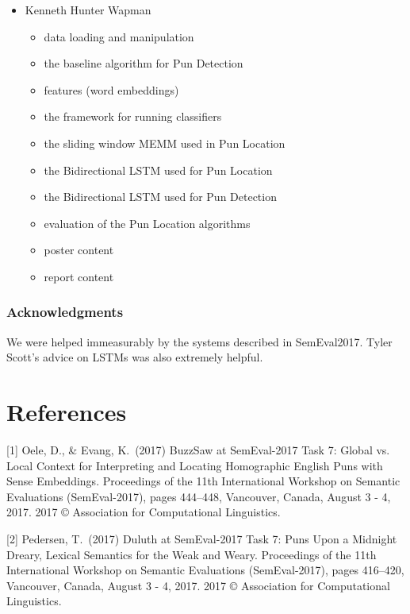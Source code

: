 \documentclass{article}
\begin{document}
\begin{itemize}
\begin{itemize}
	\end{itemize}
\item Kenneth Hunter Wapman
	\begin{itemize}
		\item data loading and manipulation
		\item the baseline algorithm for Pun Detection
		\item features (word embeddings)
		\item the framework for running classifiers
		\item the sliding window MEMM used in Pun Location
		\item the Bidirectional LSTM used for Pun Location
		\item the Bidirectional LSTM used for Pun Detection
		\item evaluation of the Pun Location algorithms
		\item poster content
		\item report content
	\end{itemize}
\end{itemize}

\subsubsection*{Acknowledgments}

We were helped immeasurably by the systems described in SemEval2017. Tyler
Scott's advice on LSTMs was also extremely helpful.

\section*{References}

\medskip

\small

[1] Oele, D., \& Evang, K.\ (2017) BuzzSaw at SemEval-2017 Task 7:
Global vs. Local Context for Interpreting and Locating Homographic English Puns
with Sense Embeddings. Proceedings of the 11th International Workshop on
Semantic Evaluations (SemEval-2017), pages 444–448, Vancouver, Canada, August 3
- 4, 2017. 2017 © Association for Computational Linguistics.

[2] Pedersen, T.\ (2017) Duluth at SemEval-2017 Task 7: Puns Upon a Midnight
Dreary, Lexical Semantics for the Weak and Weary. Proceedings of the 11th
International Workshop on Semantic Evaluations (SemEval-2017), pages 416–420,
Vancouver, Canada, August 3 - 4, 2017. 2017 © Association for Computational
Linguistics.
\end{document}
